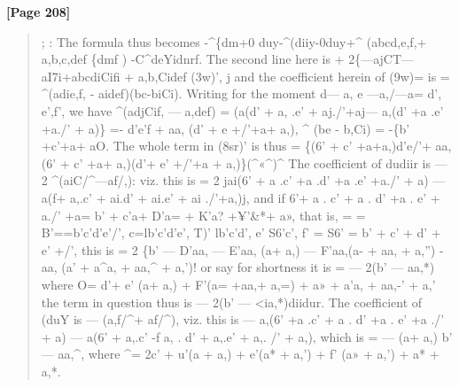 \documentclass[11pt,a4paper]{book}
\begin{document}
\textbf{[Page 208]}\\[0.2cm]
\begin{quote}
; :
The formula thus becomes
-\textasciicircum{}\{dm+0 duy-\textasciicircum{}(diiy-0duy+\textasciicircum{} (abcd,e,f,+ a,b,c,def \{dmf
)
-C\textasciicircum{}deYidnrf.
The second line here is
+ 2\{---ajCT---aI7i+abcdiCifi + a,b,Cidef (3w)',
j
and the coefficient herein of (9w)= is = \textasciicircum{}(adie,f, - aidef)(bc-biCi). Writing for the
moment d--- a, e ---a,/---a= d', e',f', we have
\textasciicircum{}(adjCif, --- a,def) = (a(d' + a, .e' + aj./'+aj--- a,(d' +a .e' +a./' + a)\}
=-
d'e'f
+
aa, (d'
+
e
+/'+a+
a,),
\textasciicircum{} (be - b,Ci) = -\{b' +c'+a+ aO.
The whole term in (8sr)' is thus
= \{(6' + c' +a+a,)d'e/'+ aa, (6' + c' +a+ a,)(d'+ e' +/'+a + a,)\}(\textasciicircum{}«\textasciicircum{})\textasciicircum{}
The coefficient of dudiir is --- 2 \textasciicircum{}(aiC/\textasciicircum{}---af/,): viz. this is
= 2 jai(6' + a .c' +a .d' +a .e' +a./' + a) --- a(f+ a,.c' + ai.d' + ai.e' + ai ./'+a,)j,
and if
6'+ a . c' + a . d' +a . e' + a./' +a= b' + c'a+ D'a= + K'a? +¥'\&*+ a»,
that is,
= =
B'==b'c'd'e'/', c=lb'c'd'e', T)' lb'c'd', e' S6'c',
f' = S6' = b' + c' + d' + e' +/',
this is
= 2 \{b' --- D'aa, --- E'aa, (a+ a,) --- F'aa,(a- + aa, + a,'') - aa, (a' + a\textasciicircum{}a, + aa,\textasciicircum{} + a,')!
or say for shortness it is = --- 2(b' --- aa,*) where
O= d'+ e' (a+ a,) + F'(a= +aa,+ a,=) + a» + a'a, + aa,-' + a,'
the term in question thus is --- 2(b' --- <ia,*)diidur.
The coefficient of (duY is --- (a,f/\textasciicircum{}+ af/\textasciicircum{}), viz. this is
--- a,(6' +a .c' + a . d' +a . e' +a ./' + a) --- a(6' + a,.c' -f a, . d' + a,.e' + a,. /' + a,),
which is = --- (a+ a,) b' --- aa,\textasciicircum{}, where
\textasciicircum{}= 2c' + u'(a + a,) + e'(a* + a,') + f' (a» + a,') + a* + a,*.
\end{quote}
\end{document}
